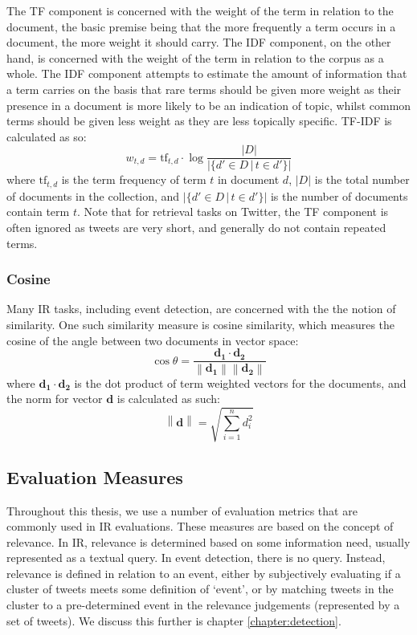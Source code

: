 The TF component is concerned with the weight of the term in relation to the document, the basic premise being that the more frequently a term occurs in a document, the more weight it should carry.
The IDF component, on the other hand, is concerned with the weight of the term in relation to the corpus as a whole.
The IDF component attempts to estimate the amount of information that a term carries on the basis that rare terms should be given more weight as their presence in a document is more likely to be an indication of topic, whilst common terms should be given less weight as they are less topically specific.
TF-IDF is calculated as so:
\begin{displaymath}
	w_{t,d} = \mathrm{tf}_{t,d} \cdot \log{\frac{|D|}{|\{d' \in D \, | \, t \in d'\}|}}
\end{displaymath}
where \(\mathrm{tf}_{t,d}\) is the term frequency of term \(t\) in document \(d\), \(|D|\) is the total number of documents in the collection, and \(|\{d' \in D \, | \, t \in d'\}|\) is the number of documents contain term \(t\).
Note that for retrieval tasks on Twitter, the TF component is often ignored as tweets are very short, and generally do not contain repeated terms.

\subsubsection{Cosine}

Many IR tasks, including event detection, are concerned with the the notion of similarity.
One such similarity measure is cosine similarity, which measures the cosine of the angle between two documents in vector space:
\begin{displaymath}
	\cos{\theta} = \frac{\mathbf{d_1} \cdot \mathbf{d_2}}{\left\| \mathbf{d_1} \right\| \left \| \mathbf{d_2} \right\|}
\end{displaymath}
where \(\mathbf{d_1} \cdot \mathbf{d_2}\) is the dot product of term weighted vectors for the documents, and the norm for vector \(\mathbf{d}\) is calculated as such:
\begin{displaymath}
	\left\| \mathbf{d} \right\| = \sqrt{\sum_{i=1}^n d_i^2}
\end{displaymath}

\subsection{Evaluation Measures}
Throughout this thesis, we use a number of evaluation metrics that are commonly used in IR evaluations.
These measures are based on the concept of relevance.
In IR, relevance is determined based on some information need, usually represented as a textual query.
In event detection, there is no query.
Instead, relevance is defined in relation to an event, either by subjectively evaluating if a cluster of tweets meets some definition of `event', or by matching tweets in the cluster to a pre-determined event in the relevance judgements (represented by a set of tweets).
We discuss this further is chapter \ref{chapter:detection}.

